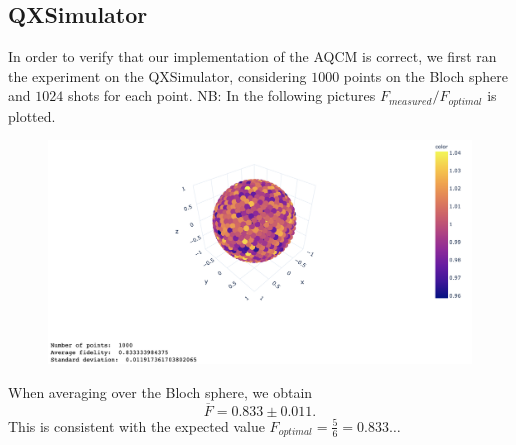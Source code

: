 \documentclass[11p]{article}
\begin{document}
\subsection*{QXSimulator}
In order to verify that our implementation of the AQCM is correct, we first ran the experiment on the QXSimulator, considering $1000$ points on the Bloch sphere and $1024$ shots for each point.
NB: In the following pictures $F_{measured}/F_{optimal}$ is plotted.
\begin{figure}[H]
    \centering
            \includegraphics[totalheight=6cm]{Figures/simulator_F.png}
        \label{fig:2a}
\end{figure}
When averaging over the Bloch sphere, we obtain
\[
    \overline{F}=0.833 \pm 0.011.
\]
This is consistent with the expected value $F_{optimal}=\frac{5}{6}=0.833\dots$
\end{document}
